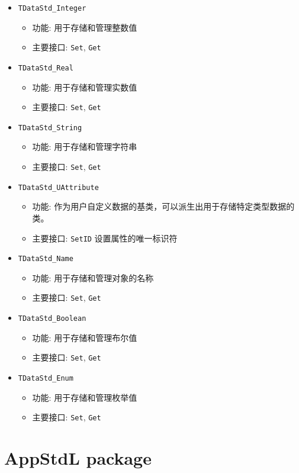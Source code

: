 \documentclass[11pt]{article}
\begin{document}
\begin{itemize}
\item \texttt{TDataStd\_Integer}
\begin{itemize}
\item 功能: 用于存储和管理整数值
\item 主要接口: \texttt{Set}, \texttt{Get}
\end{itemize}
\item \texttt{TDataStd\_Real}
\begin{itemize}
\item 功能: 用于存储和管理实数值
\item 主要接口: \texttt{Set}, \texttt{Get}
\end{itemize}
\item \texttt{TDataStd\_String}
\begin{itemize}
\item 功能: 用于存储和管理字符串
\item 主要接口: \texttt{Set}, \texttt{Get}
\end{itemize}
\item \texttt{TDataStd\_UAttribute}
\begin{itemize}
\item 功能: 作为用户自定义数据的基类，可以派生出用于存储特定类型数据的类。
\item 主要接口: \texttt{SetID} 设置属性的唯一标识符
\end{itemize}
\item \texttt{TDataStd\_Name}
\begin{itemize}
\item 功能: 用于存储和管理对象的名称
\item 主要接口: \texttt{Set}, \texttt{Get}
\end{itemize}
\item \texttt{TDataStd\_Boolean}
\begin{itemize}
\item 功能: 用于存储和管理布尔值
\item 主要接口: \texttt{Set}, \texttt{Get}
\end{itemize}
\item \texttt{TDataStd\_Enum}
\begin{itemize}
\item 功能: 用于存储和管理枚举值
\item 主要接口: \texttt{Set}, \texttt{Get}
\end{itemize}
\end{itemize}
\section{AppStdL package}
\label{sec:org77854b6}
\end{document}
